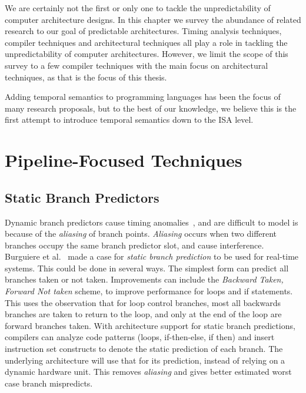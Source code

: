 \label{sec:related_arch_mod}
We are certainly not the first or only one to tackle the unpredictability of computer architecture designs.
In this chapter we survey the abundance of related research to our goal of predictable architectures.
Timing analysis techniques, compiler techniques and architectural techniques all play a role in tackling the unpredictability of computer architectures.
However, we limit the scope of this survey to a few compiler techniques with the main focus on architectural techniques, as that is the focus of this thesis. 

Adding temporal semantics to programming languages has been the focus of many research proposals, but to the best of our knowledge, we believe this is the first attempt to introduce temporal semantics down to the ISA level. 


\section{Pipeline-Focused Techniques}
\subsection{Static Branch Predictors}
\label{sec:RTBranch}
Dynamic branch predictors cause timing anomalies~\cite{Engblom2003dynbranch}, and are difficult to model is because of the \textit{aliasing} of branch points.   
\textit{Aliasing} occurs when two different branches occupy the same branch predictor slot, and cause interference.
Burguiere et al.~\cite{Burguiere2005staticbranchpredict} made a case for \textit{static branch prediction} to be used for real-time systems.
This could be done in several ways. 
The simplest form can predict all branches taken or not taken. 
Improvements can include the \textit{Backward Taken, Forward Not taken} scheme, to improve performance for loops and if statements.
This uses the observation that for loop control branches, most all backwards branches are taken to return to the loop, and only at the end of the loop are forward branches taken. 
With architecture support for static branch predictions, compilers can analyze code patterns (loops, if-then-else, if then) and insert instruction set constructs to denote the static prediction of each branch.  
The underlying architecture will use that for its prediction, instead of relying on a dynamic hardware unit.
This removes \textit{aliasing} and gives better estimated worst case branch mispredicts. 

